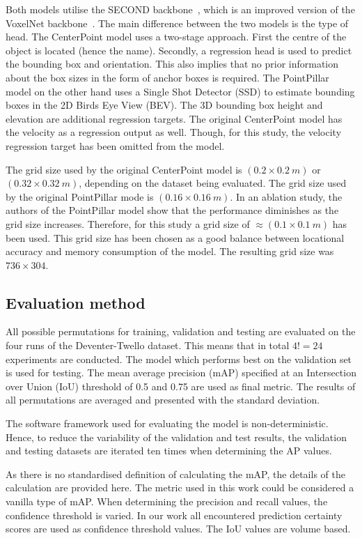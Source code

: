 Both models utilise the SECOND backbone~\cite{second18}, which is an improved version of the VoxelNet backbone~\cite{voxelnet18}. The main difference between the two models is the type of head. The CenterPoint model uses a two-stage approach. First the centre of the object is located (hence the name). Secondly, a regression head is used to predict the bounding box and orientation. This also implies that no prior information about the box sizes in the form of anchor boxes is required. The PointPillar model on the other hand uses a Single Shot Detector (SSD) to estimate bounding boxes in the 2D Birds Eye View (BEV). The 3D bounding box height and elevation are additional regression targets. The original CenterPoint model has the velocity as a regression output as well. Though, for this study, the velocity regression target has been omitted from the model.

The grid size used by the original CenterPoint model is $(0.2\times 0.2~m)$ or $(0.32\times 0.32~m)$, depending on the dataset being evaluated. The grid size used by the original PointPillar mode is $(0.16\times 0.16~m)$. In an ablation study, the authors of the PointPillar model show that the performance diminishes as the grid size increases. Therefore, for this study a grid size of  $\approx (0.1\times 0.1~m)$ has been used. This grid size has been chosen as a good balance between locational accuracy and memory consumption of the model. The resulting grid size was \(736\times 304\).

\subsection{Evaluation method}
All possible permutations for training, validation and testing are evaluated on the four runs of the Deventer-Twello dataset. This means that in total $4! = 24$ experiments are conducted. The model which performs best on the validation set is used for testing. The mean average precision (mAP) specified at an Intersection over Union (IoU) threshold of 0.5 and 0.75 are used as final metric. The results of all permutations are averaged and presented with the standard deviation.

The software framework used for evaluating the model is non-deterministic. Hence, to reduce the variability of the validation and test results, the validation and testing datasets are iterated ten times when determining the AP values.

As there is no standardised definition of calculating the mAP, the details of the calculation are provided here. The metric used in this work could be considered a vanilla type of mAP. When determining the precision and recall values, the confidence threshold is varied. In our work all encountered prediction certainty scores are used as confidence threshold values. The IoU values are volume based.

